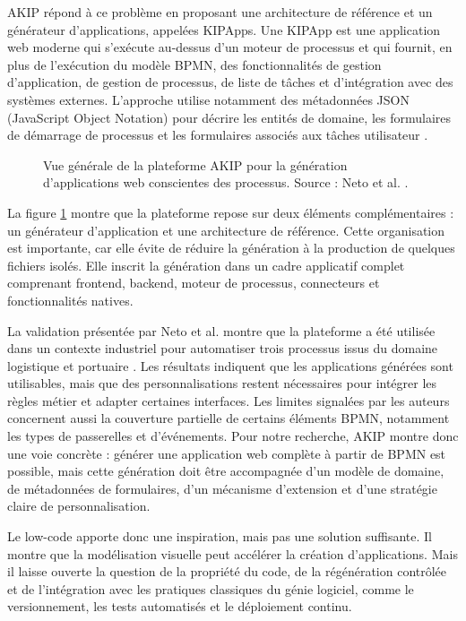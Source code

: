 AKIP répond à ce problème en proposant une architecture de référence et
un générateur d'applications, appelées KIPApps. Une KIPApp est une
application web moderne qui s'exécute au-dessus d'un moteur de processus
et qui fournit, en plus de l'exécution du modèle BPMN, des
fonctionnalités de gestion d'application, de gestion de processus, de
liste de tâches et d'intégration avec des systèmes externes. L'approche
utilise notamment des métadonnées JSON (JavaScript Object Notation) pour
décrire les entités de domaine, les formulaires de démarrage de
processus et les formulaires associés aux tâches utilisateur \cite{neto2022}.

\begin{figure}[H]
\centering
{}
\caption{Vue générale de la plateforme AKIP pour la génération
d'applications web conscientes des processus. Source : Neto et al.
\cite{neto2022}.}
\label{fig:plateforme-akip}
\end{figure}

La figure \ref{fig:plateforme-akip} montre que la plateforme repose sur deux éléments
complémentaires : un générateur d'application et une architecture de
référence. Cette organisation est importante, car elle évite de réduire
la génération à la production de quelques fichiers isolés. Elle inscrit
la génération dans un cadre applicatif complet comprenant frontend,
backend, moteur de processus, connecteurs et fonctionnalités natives.

La validation présentée par Neto et al. montre que la plateforme a été
utilisée dans un contexte industriel pour automatiser trois processus
issus du domaine logistique et portuaire \cite{neto2022}. Les résultats
indiquent que les applications générées sont utilisables, mais que des
personnalisations restent nécessaires pour intégrer les règles métier et
adapter certaines interfaces. Les limites signalées par les auteurs
concernent aussi la couverture partielle de certains éléments BPMN,
notamment les types de passerelles et d'événements. Pour notre
recherche, AKIP montre donc une voie concrète : générer une application
web complète à partir de BPMN est possible, mais cette génération doit
être accompagnée d'un modèle de domaine, de métadonnées de formulaires,
d'un mécanisme d'extension et d'une stratégie claire de
personnalisation.

Le low-code apporte donc une inspiration, mais pas une solution
suffisante. Il montre que la modélisation visuelle peut accélérer la
création d'applications. Mais il laisse ouverte la question de la
propriété du code, de la régénération contrôlée et de l'intégration avec
les pratiques classiques du génie logiciel, comme le versionnement, les
tests automatisés et le déploiement continu.

